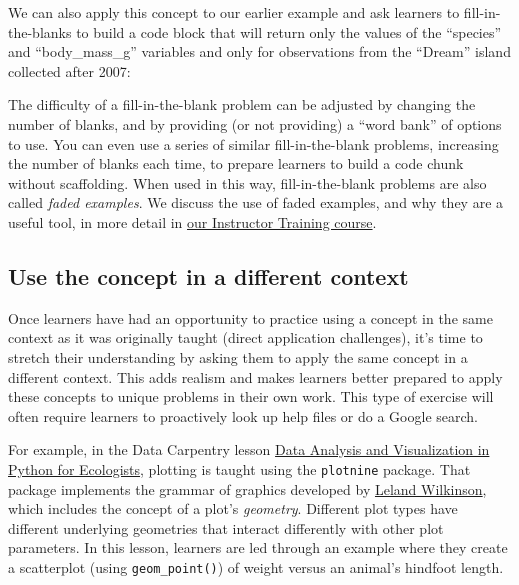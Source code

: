 \documentclass[]{book}
\newenvironment{Shaded}{\begin{snugshade}}{\end{snugshade}}
\newcommand{\DecValTok}[1]{\textcolor[rgb]{0.00,0.00,0.81}{#1}}
\newcommand{\KeywordTok}[1]{\textcolor[rgb]{0.13,0.29,0.53}{\textbf{#1}}}
\newcommand{\NormalTok}[1]{#1}
\newcommand{\OperatorTok}[1]{\textcolor[rgb]{0.81,0.36,0.00}{\textbf{#1}}}
\newcommand{\StringTok}[1]{\textcolor[rgb]{0.31,0.60,0.02}{#1}}
\begin{document}
We can also apply this concept to our earlier example and ask learners to fill-in-the-blanks
to build a code block that will return only the values of the ``species'' and ``body\_mass\_g''
variables and only for observations from the ``Dream'' island collected after 2007:

\begin{Shaded}
\end{Shaded}

The difficulty of a fill-in-the-blank problem can be adjusted by changing the number of blanks,
and by providing (or not providing) a ``word bank'' of options to use. You can even use a series
of similar fill-in-the-blank problems, increasing the number of blanks each time, to prepare
learners to build a code chunk without scaffolding. When used in this way, fill-in-the-blank
problems are also called \emph{faded examples}. We discuss the use of faded examples, and why they
are a useful tool, in more detail in
\href{https://carpentries.github.io/instructor-training/05-memory/index.html}{our Instructor Training course}.

\hypertarget{use-the-concept-in-a-different-context}{%
\subsection{Use the concept in a different context}\label{use-the-concept-in-a-different-context}}

Once learners have had an opportunity to practice using a concept in the same context as
it was originally taught (direct application challenges), it's time to stretch their
understanding by asking them to apply the same concept in a different context. This adds
realism and makes learners better prepared to apply these concepts to unique
problems in their own work. This type of exercise will often require learners to proactively
look up help files or do a Google search.

For example, in the Data Carpentry lesson \href{https://datacarpentry.org/python-ecology-lesson/07-visualization-ggplot-python/index.html}{Data Analysis and Visualization in Python for Ecologists},
plotting is taught using the \texttt{plotnine} package. That package implements the grammar of graphics developed by
\href{https://en.wikipedia.org/wiki/Leland_Wilkinson}{Leland Wilkinson}, which includes the concept
of a plot's \emph{geometry}. Different plot types have different underlying geometries that interact
differently with other plot parameters. In this lesson, learners are led through an example
where they create a scatterplot (using \texttt{geom\_point()}) of weight versus an animal's hindfoot
length.
\end{document}
